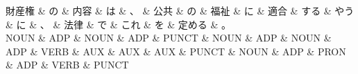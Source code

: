 \documentclass[tikz,border=5pt]{standalone}
\begin{document}
\normalsize
\begin{dependency}[edge unit distance=12.0pt]
    \begin{deptext}[column sep=1em]
        財産権 \& の \& 内容 \& は \& 、 \& 公共 \& の \& 福祉 \& に \& 適合 \& する \& やう \& に \& 、 \& 法律 \& で \& これ \& を \& 定める \& 。\\
        NOUN \& ADP \& NOUN \& ADP \& PUNCT \& NOUN \& ADP \& NOUN \& ADP \& VERB \& AUX \& AUX \& AUX \& PUNCT \& NOUN \& ADP \& PRON \& ADP \& VERB \& PUNCT\\
    \end{deptext}
\end{dependency}
\end{document}
